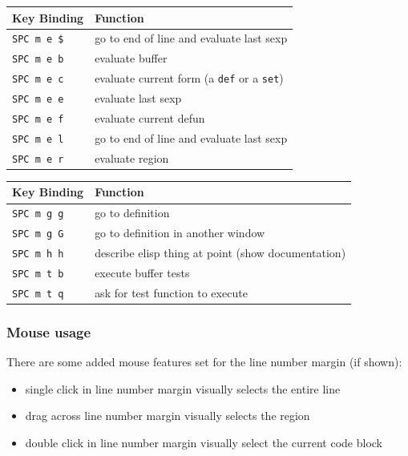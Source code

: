 \documentclass[11pt]{article}
\begin{document}
\begin{enumerate}
\begin{enumerate}
\begin{center}
\begin{tabular}{ll}
Key Binding & Function\\
\hline
\texttt{SPC m e \$} & go to end of line and evaluate last sexp\\
\texttt{SPC m e b} & evaluate buffer\\
\texttt{SPC m e c} & evaluate current form (a \texttt{def} or a \texttt{set})\\
\texttt{SPC m e e} & evaluate last sexp\\
\texttt{SPC m e f} & evaluate current defun\\
\texttt{SPC m e l} & go to end of line and evaluate last sexp\\
\texttt{SPC m e r} & evaluate region\\
\end{tabular}
\end{center}

\begin{center}
\begin{tabular}{ll}
Key Binding & Function\\
\hline
\texttt{SPC m g g} & go to definition\\
\texttt{SPC m g G} & go to definition in another window\\
\texttt{SPC m h h} & describe elisp thing at point (show documentation)\\
\texttt{SPC m t b} & execute buffer tests\\
\texttt{SPC m t q} & ask for test function to execute\\
\end{tabular}
\end{center}
\end{enumerate}
\end{enumerate}

\subsubsection{Mouse usage}
\label{sec:org35e27ad}
There are some added mouse features set for the line number margin (if shown):

\begin{itemize}
\item single click in line number margin visually selects the entire line
\item drag across line number margin visually selects the region
\item double click in line number margin visually select the current code block
\end{itemize}
\end{document}
